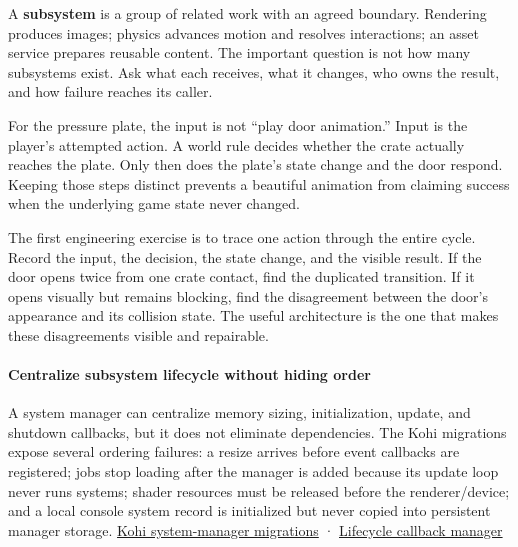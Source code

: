 A \textbf{subsystem} is a group of related work with an agreed boundary. Rendering produces images; physics advances motion and resolves interactions; an asset service prepares reusable content. The important question is not how many subsystems exist. Ask what each receives, what it changes, who owns the result, and how failure reaches its caller.


For the pressure plate, the input is not ``play door animation.'' Input is the player's attempted action. A world rule decides whether the crate actually reaches the plate. Only then does the plate's state change and the door respond. Keeping those steps distinct prevents a beautiful animation from claiming success when the underlying game state never changed.

The first engineering exercise is to trace one action through the entire cycle. Record the input, the decision, the state change, and the visible result. If the door opens twice from one crate contact, find the duplicated transition. If it opens visually but remains blocking, find the disagreement between the door's appearance and its collision state. The useful architecture is the one that makes these disagreements visible and repairable.

\paragraph{Centralize subsystem lifecycle without hiding order}\label{05-engine-i-ch001-centralize-subsystem-lifecycle-without-hiding-order}

\hypertarget{05-engine-i-ch001-centralize-subsystem-lifecycle-without-hiding-order}{}

A system manager can centralize memory sizing, initialization, update, and shutdown callbacks, but it does not eliminate dependencies. The Kohi migrations expose several ordering failures: a resize arrives before event callbacks are registered; jobs stop loading after the manager is added because its update loop never runs systems; shader resources must be released before the renderer/device; and a local console system record is initialized but never copied into persistent manager storage. \href{https://www.youtube.com/watch?v=l6QDHJ7_rPk}{Kohi system-manager migrations} · \href{https://www.youtube.com/watch?v=vOrkxRPWDVA}{Lifecycle callback manager}

